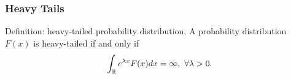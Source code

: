 \begin{frame}
    \frametitle{Heavy Tails}

    \begin{alertblock}{Definition: heavy-tailed probability distribution, \cite{foss_heavy-tailed_2013}}
        A probability distribution $F(x)$ is heavy-tailed if and only if
        \begin{equation*}
            \int_{\mathbb{R}} e^{\lambda x} F(x) dx = \infty, \ \forall \lambda > 0.
        \end{equation*}    
    \end{alertblock}
\end{frame}
